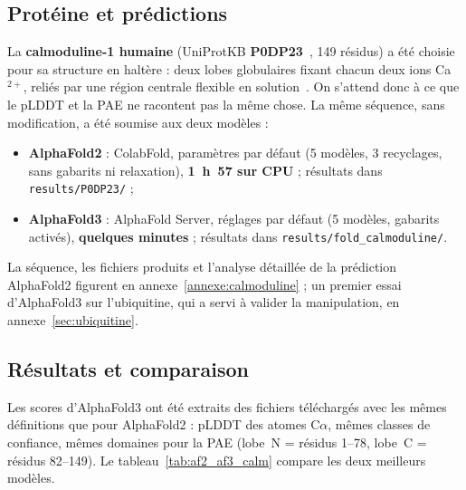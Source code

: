 \subsection{Protéine et prédictions}
\label{sec:test}

La \textbf{calmoduline-1 humaine} (UniProtKB \textbf{P0DP23}~\cite{uniprot_P0DP23}, 149 résidus) a été choisie pour sa structure en \og haltère \fg{} : deux lobes globulaires fixant chacun deux ions Ca$^{2+}$, reliés par une région centrale flexible en solution~\cite{barbato1992}. On s'attend donc à ce que le pLDDT et la PAE ne racontent pas la même chose. La même séquence, sans modification, a été soumise aux deux modèles :
\begin{itemize}
  \item \textbf{AlphaFold2} : ColabFold, paramètres par défaut (5 modèles, 3 recyclages, sans gabarits ni relaxation), \textbf{1~h~57 sur CPU} ; résultats dans \texttt{results/P0DP23/} ;
  \item \textbf{AlphaFold3} : AlphaFold Server, réglages par défaut (5 modèles, gabarits activés), \textbf{quelques minutes} ; résultats dans \texttt{results/fold\_calmoduline/}.
\end{itemize}
La séquence, les fichiers produits et l'analyse détaillée de la prédiction AlphaFold2 figurent en annexe~\ref{annexe:calmoduline} ; un premier essai d'AlphaFold3 sur l'ubiquitine, qui a servi à valider la manipulation, en annexe~\ref{sec:ubiquitine}.

\subsection{Résultats et comparaison}

Les scores d'AlphaFold3 ont été extraits des fichiers téléchargés avec les mêmes définitions que pour AlphaFold2 : pLDDT des atomes C$\alpha$, mêmes classes de confiance, mêmes domaines pour la PAE (lobe~N = résidus 1--78, lobe~C = résidus 82--149). Le tableau~\ref{tab:af2_af3_calm} compare les deux meilleurs modèles.

